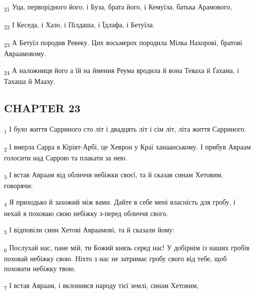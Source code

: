 \begin{tcolorbox}
\textsubscript{21} Уца, перворідного його, і Буза, брата його, і Кемуїла, батька Арамового,
\end{tcolorbox}
\begin{tcolorbox}
\textsubscript{22} І Кеседа, і Хазо, і Пілдаша, і Їдлафа, і Бетуїла.
\end{tcolorbox}
\begin{tcolorbox}
\textsubscript{23} А Бетуїл породив Ревеку. Цих восьмерох породила Мілка Нахорові, братові Авраамовому.
\end{tcolorbox}
\begin{tcolorbox}
\textsubscript{24} А наложниця його а їй на ймення Реума вродила й вона Теваха й Ґахама, і Тахаша й Мааху.
\end{tcolorbox}
\subsection{CHAPTER 23}
\begin{tcolorbox}
\textsubscript{1} І було життя Сарриного сто літ і двадцять літ і сім літ, літа життя Сарриного.
\end{tcolorbox}
\begin{tcolorbox}
\textsubscript{2} І вмерла Сарра в Кіріят-Арбі, це Хеврон у Краї ханаанському. І прибув Авраам голосити над Саррою та плакати за нею.
\end{tcolorbox}
\begin{tcolorbox}
\textsubscript{3} І встав Авраам від обличчя небіжки своєї, та й сказав синам Хетовим, говорячи:
\end{tcolorbox}
\begin{tcolorbox}
\textsubscript{4} Я приходько й захожий між вами. Дайте в себе мені власність для гробу, і нехай я поховаю свою небіжку з-перед обличчя свого.
\end{tcolorbox}
\begin{tcolorbox}
\textsubscript{5} І відповіли сини Хетові Авраамові, та й сказали йому:
\end{tcolorbox}
\begin{tcolorbox}
\textsubscript{6} Послухай нас, пане мій, ти Божий князь серед нас! У добірнім із наших гробів поховай небіжку свою. Ніхто з нас не затримає гробу свого від тебе, щоб поховати небіжку твою.
\end{tcolorbox}
\begin{tcolorbox}
\textsubscript{7} І встав Авраам, і вклонився народу тієї землі, синам Хетовим,
\end{tcolorbox}
